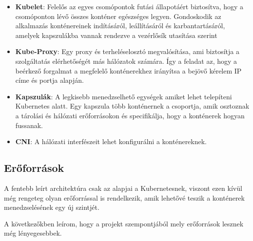 \begin{itemize}
	\item \textbf{Kubelet}: Felelős az egyes csomópontok futási állapotáért biztosítva, 
	hogy a csomóponton lévő összes konténer egészséges legyen. Gondoskodik az alkalmazás
	konténereinek indításáról, leállításáról és karbantartásáról, amelyek kapszulákba 
	vannak rendezve a vezérlősík utasítása szerint
	\item \textbf{Kube-Proxy}: Egy proxy és terheléselosztó megvalósítása, ami biztosítja
	a szolgáltatás elérhetőségét más hálózatok számára. Így a feladat az, hogy a beérkező
	forgalmat a megfelelő konténerekhez irányítsa a bejövő kérelem IP címe és 
	portja alapján. 
	\item \textbf{Kapszulák}: A legkisebb menedzselhető egységek amiket lehet telepíteni
	Kubernetes alatt. Egy kapszula több konténernek a csoportja, amik osztoznak a tárolási
	és hálózati erőforrásokon és specifikálja, hogy a konténerek hogyan fussanak. 
	\item \textbf{CNI}: A hálózati interfészeit lehet konfigurálni a konténereknek.
\end{itemize}

\subsection{Erőforrások}

A fentebb leírt architektúra csak az alapjai a Kubernetesnek, viszont ezen kívül
még rengeteg olyan erőforrással is rendelkezik, amik lehetővé teszik a konténerek
menedzselésének egy új szintjét.

A következőkben leírom, hogy a projekt szempontjából mely erőforrások lesznek még
lényegesebbek. 

